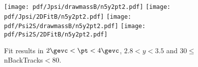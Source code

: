 \begin{figure}[H]
\begin{center}
\texttt{[image: pdf/Jpsi/drawmassB/n5y2pt2.pdf]}
\texttt{[image: pdf/Jpsi/2DFitB/n5y2pt2.pdf]}
\vspace*{-0.5cm}
\texttt{[image: pdf/Psi2S/drawmassB/n5y2pt2.pdf]}
\texttt{[image: pdf/Psi2S/2DFitB/n5y2pt2.pdf]}
\vspace*{-0.5cm}
\end{center}
\caption{Fit results in $2\gevc<\pt<4\gevc$, $2.8<y<3.5$ and 30$\leq$nBackTracks$<$80.}
\label{Fitn5y2pt2}
\end{figure}
